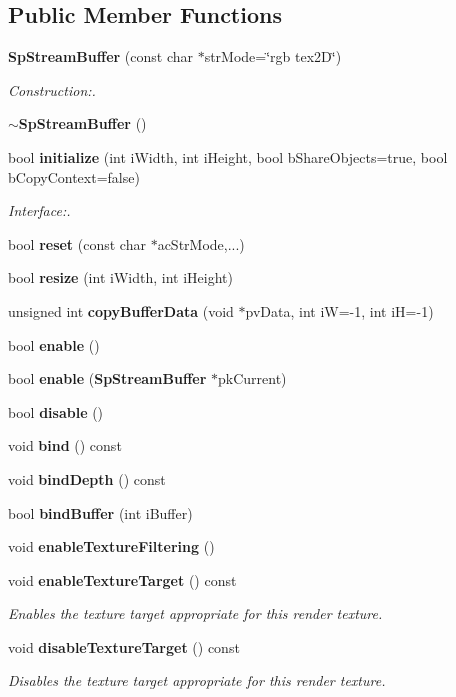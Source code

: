 \subsection*{Public Member Functions}
\begin{CompactItemize}
\item 
{\bf Sp\-Stream\-Buffer} (const char $\ast$str\-Mode=\char`\"{}rgb tex2D\char`\"{})
\begin{CompactList}\small\item\em Construction:. \item\end{CompactList}\item 
{\bf $\sim$Sp\-Stream\-Buffer} ()
\item 
bool {\bf initialize} (int i\-Width, int i\-Height, bool b\-Share\-Objects=true, bool b\-Copy\-Context=false)
\begin{CompactList}\small\item\em Interface:. \item\end{CompactList}\item 
bool {\bf reset} (const char $\ast$ac\-Str\-Mode,...)
\item 
bool {\bf resize} (int i\-Width, int i\-Height)
\item 
unsigned int {\bf copy\-Buffer\-Data} (void $\ast$pv\-Data, int i\-W=-1, int i\-H=-1)
\item 
bool {\bf enable} ()
\item 
bool {\bf enable} ({\bf Sp\-Stream\-Buffer} $\ast$pk\-Current)
\item 
bool {\bf disable} ()
\item 
void {\bf bind} () const
\item 
void {\bf bind\-Depth} () const
\item 
bool {\bf bind\-Buffer} (int i\-Buffer)
\item 
void {\bf enable\-Texture\-Filtering} ()
\item 
void {\bf enable\-Texture\-Target} () const
\begin{CompactList}\small\item\em Enables the texture target appropriate for this render texture. \item\end{CompactList}\item 
void {\bf disable\-Texture\-Target} () const
\begin{CompactList}\small\item\em Disables the texture target appropriate for this render texture. \item\end{CompactList}\item 

\end{CompactItemize}
